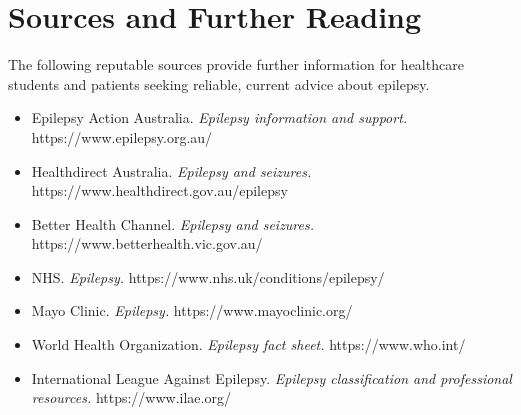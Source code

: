 \section*{Sources and Further Reading}
The following reputable sources provide further information for healthcare students and patients seeking reliable, current advice about epilepsy.
\begin{itemize}
    \item Epilepsy Action Australia. \textit{Epilepsy information and support.} https://www.epilepsy.org.au/
    \item Healthdirect Australia. \textit{Epilepsy and seizures.} https://www.healthdirect.gov.au/epilepsy
    \item Better Health Channel. \textit{Epilepsy and seizures.} https://www.betterhealth.vic.gov.au/
    \item NHS. \textit{Epilepsy.} https://www.nhs.uk/conditions/epilepsy/
    \item Mayo Clinic. \textit{Epilepsy.} https://www.mayoclinic.org/
    \item World Health Organization. \textit{Epilepsy fact sheet.} https://www.who.int/
    \item International League Against Epilepsy. \textit{Epilepsy classification and professional resources.} https://www.ilae.org/
\end{itemize}
